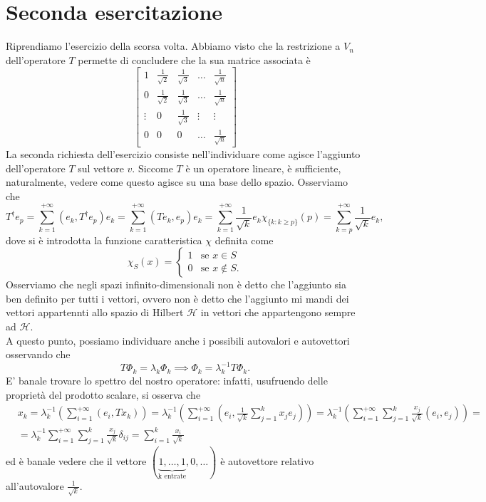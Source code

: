 \documentclass[12pt, twoside, italian, openany]{book}
\begin{document}
	\chapter{Seconda esercitazione}
	Riprendiamo l'esercizio della scorsa volta. Abbiamo visto che la restrizione a $V_n$ dell'operatore $T$ permette di concludere che la sua matrice associata è
	\begin{equation*}
		\begin{bmatrix}
			1 & \frac{1}{\sqrt{2}} & \frac{1}{\sqrt{3}} & \ldots & \frac{1}{\sqrt{n}} \\
			0 & \frac{1}{\sqrt{2}} & \frac{1}{\sqrt{3}} & \ldots & \frac{1}{\sqrt{n}} \\
			\vdots & 0			   & \frac{1}{\sqrt{3}} & \vdots & \vdots \\
			0 & 0 & 0 & \ldots & \frac{1}{\sqrt{n}}
		\end{bmatrix}
	\end{equation*}
	La seconda richiesta dell'esercizio consiste nell'individuare come agisce l'aggiunto dell'operatore $T$ sul vettore $v$. Siccome $T$ è un operatore lineare, è sufficiente, naturalmente, vedere come questo agisce su una base dello spazio. Osserviamo che
	$$
		T^{\dag} e_p = \sum_{k=1}^{+\infty} (e_k, T^{\dag} e_p) e_k = \sum_{k=1}^{+\infty} (Te_k, e_p) e_k = \sum_{k=1}^{+\infty} \frac{1}{\sqrt{k}} e_k \chi_{\{k : k \geq p \}}(p) = \sum_{k=p}^{+\infty} \frac{1}{\sqrt{k}} e_k,
	$$
	dove si è introdotta la funzione caratteristica $\chi$ definita come
	$$
	\chi_S(x) = \begin{cases}
		1 & \text{se } x \in S \\
		0 & \text{se } x \not\in S.
	\end{cases}
	$$
	Osserviamo che negli spazi infinito-dimensionali non è detto che l'aggiunto sia ben definito per tutti i vettori, ovvero non è detto che l'aggiunto mi mandi dei vettori appartennti allo spazio di Hilbert $\mathcal{H}$ in vettori che appartengono sempre ad $\mathcal{H}$. \\
	A questo punto, possiamo individuare anche i possibili autovalori e autovettori osservando che
	$$
		T \Phi_k = \lambda_k \Phi_k \implies \Phi_k = \lambda^{-1}_k T \Phi_k.
	$$
	E' banale trovare lo spettro del nostro operatore: infatti, usufruendo delle proprietà del prodotto scalare, si osserva che
	\begin{align*}
		&x_k = \lambda^{-1}_k (\sum_{i=1}^{+\infty} (e_i, Tx_k) ) = \lambda^{-1}_k (\sum_{i=1}^{+\infty} (e_i, \frac{1}{\sqrt{k}} \sum_{j=1}^k x_j e_j)) = \lambda^{-1}_k ( \sum_{i=1}^{+\infty} \sum_{j=1}^{k} \frac{x_j}{\sqrt{k}} (e_i,e_j)) = \\
		&= \lambda^{-1}_k \sum_{i=1}^{+\infty} \sum_{j=1}^{k} \frac{x_j}{\sqrt{k}} \delta_{ij} = \sum_{i=1}^k \frac{x_i}{\sqrt{k}}
	\end{align*}
	ed è banale vedere che il vettore $(\underbrace{1, \ldots, 1}_{\text{k entrate}}, 0, \ldots)$ è autovettore relativo all'autovalore $\frac{1}{\sqrt{k}}$. 
\end{document}
